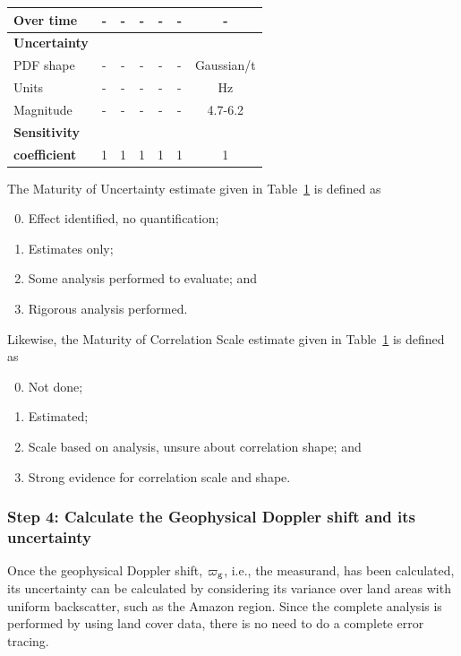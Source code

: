 \begin{table}[ht]
\begin{tabular}{|l|c|c|c|c|c|c|}
    Over time & - & - & - & - & - & - \\ \hline
    \textbf{Uncertainty} &  & &  &  &&  \\ \hline
    PDF shape & - & - & - & - & - & Gaussian/t \\ \hline
    Units & - & -&  -&  -&  -& Hz \\ \hline
    Magnitude & - & -& -&  -&  -& 4.7-6.2 \\ \hline
    \textbf{Sensitivity} & & & &  &  &  \\
    \textbf{coefficient} & 1 & 1 & 1 & 1 & 1 & 1 \\ \hline
  \end{tabular}

  \label{tab:doppler_effects_table}
\end{table}

\noindent The Maturity of Uncertainty estimate given in
Table~\ref{tab:doppler_effects_table} is defined as
\begin{enumerate}
    \setcounter{enumi}{-1}
  \item Effect identified, no quantification;
  \item Estimates only;
  \item Some analysis performed to evaluate; and
  \item Rigorous analysis performed.
\end{enumerate}

\noindent Likewise, the Maturity of Correlation Scale estimate given in
Table~\ref{tab:doppler_effects_table} is defined as
\begin{enumerate}
    \setcounter{enumi}{-1}
  \item Not done;
  \item Estimated;
  \item Scale based on analysis, unsure about correlation shape; and
  \item Strong evidence for correlation scale and shape.
\end{enumerate}

\clearpage

\subsubsection{Step 4: Calculate the Geophysical Doppler shift and its uncertainty}

Once the geophysical Doppler shift, $\varpi_{\rm g}$, i.e., the measurand, has
been calculated, its uncertainty can be calculated by considering its variance
over land areas with uniform backscatter, such as the Amazon region. Since the
complete analysis is performed by using land cover data, there is no need to do
a complete error tracing.


